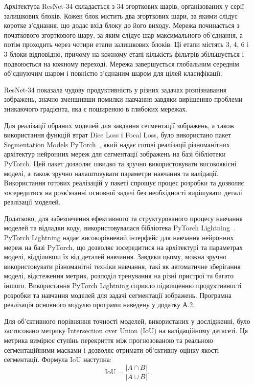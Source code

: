 Архітектура ResNet-34 складається з 34 згорткових шарів,
організованих у серії залишкових блоків. Кожен блок містить
два згорткових шари, за якими слідує коротке з'єднання,
що додає вхід блоку до його виходу. Мережа починається
з початкового згорткового шару, за яким слідує шар
максимального об'єднання, а потім проходить через
чотири етапи залишкових блоків. Ці етапи містять 3, 4, 6
і 3 блоки відповідно, причому на кожному етапі кількість
фільтрів збільшується і подвоюється на кожному переході.
Мережа завершується глобальним середнім об'єднуючим шаром
і повністю з'єднаним шаром для цілей класифікації.

ResNet-34 показала чудову продуктивність у різних задачах розпізнавання
зображень, значно зменшивши помилки навчання завдяки вирішенню проблеми
зникаючого градієнта, яка є поширеною в глибоких мережах.

Для реалізації обраних моделей для завдання сегментації
зображень, а також використання функцій втрат Dice Loss і Focal Loss,
було використано пакет Segmentation Models
PyTorch~\cite{iakubovskii2019}, який
надає готові реалізації різноманітних архітектур
нейронних мереж для сегментації зображень на базі
бібліотеки PyTorch. Цей пакет дозволяє швидко та зручно
використовувати високоякісні моделі, а також зручно
налаштовувати параметри навчання та валідації.
Використання готових реалізацій у пакеті спрощує
процес розробки та дозволяє зосередитися на розв'язанні
основної задачі без необхідності вирішувати деталі
реалізації моделей.

Додатково, для забезпечення ефективного та
структурованого процесу навчання моделей та відладки
коду, використовувалася бібліотека PyTorch Lightning~\cite{falcon2019}.
PyTorch Lightning надає високорівневий інтерфейс для
навчання нейронних мереж на базі PyTorch, що дозволяє
зосередитися на архітектурі та параметрах моделі,
відділивши їх від деталей навчання. Завдяки цьому,
можна зручно використовувати різноманітні техніки
навчання, такі як автоматичне зберігання моделі,
відстеження метрик, розподіл тренування на різні
пристрої та багато іншого. Використання PyTorch
Lightning сприяло підвищенню продуктивності розробки
та навчання моделей для задачі сегментації зображень.
Програмна реалізація основного модулю програми наведену у додатку А.2.

Для об'єктивного порівняння точності моделей,
використаних у дослідженні, було застосовано метрику
Intersection over Union (IoU) на валідаційному датасеті.
Ця метрика вимірює ступінь перекриття між прогнозованою
та реальною сегментаційними масками і дозволяє отримати
об'єктивну оцінку якості сегментації. Формула IoU наступна:
\begin{equation*}
      \text{IoU} = \frac{|A \cap B|}{|A \cup B|}.
\end{equation*}

